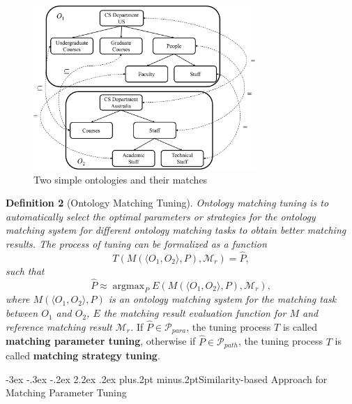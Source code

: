 \documentclass[twoside]{article}
\makeatletter
\def\section{\@startsection{section}{1}{\z@}%
 {-3ex \@plus -.3ex \@minus -.2ex}%
 {2.2ex \@plus.2ex}%
{\normalfont\normalsize\protect\baselineskip=14.5pt plus.2pt minus.2pt\bfseries}}
\makeatother
\begin{document}
\begin{figure}
	\centering
		\includegraphics[width=0.75\textwidth]{figures/onto_matching_ex.pdf}
	\caption{Two simple ontologies and their matches}
	\label{fig:onto_matching_ex}
\end{figure}



{\bf Definition 2} (Ontology Matching Tuning).
{\it
Ontology matching tuning is to automatically select the optimal parameters or strategies for the ontology matching system for different ontology matching tasks to obtain better matching results.
The process of tuning can be formalized as a function
$$T(M (\langle O_1, O_2\rangle , P), \mathcal {M}_r) = \hat{P},$$
such that
$$\hat{P} \approx \mathop{\arg\max}_{P} E (M (\langle O_1, O_2\rangle , P), \mathcal {M}_r),$$
where $M (\langle O_1, O_2\rangle , P) $ is an ontology matching system for the matching task between $ O_1$ and $ O_2 $,
$E$ the matching result evaluation function for $M$ and reference matching result $ \mathcal {M}_r $.
}
If $\hat{P} \in \mathcal{P}_{para} $, the tuning process $T$ is called {\bf matching parameter tuning},
otherwise if $\hat{P} \in \mathcal{P}_{path} $, the tuning process $T$ is called {\bf matching strategy tuning}.


\section{Similarity-based Approach for Matching Parameter Tuning}
\end{document}

